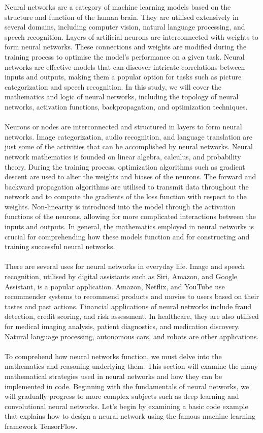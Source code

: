 \documentclass{article}[12pt]
\newcounter{example}[section]
\theoremstyle{definition}
\begin{document}
Neural networks are a category of machine learning models based on the structure and function of the human brain. They are utilised extensively in several domains, including computer vision, natural language processing, and speech recognition. Layers of artificial neurons are interconnected with weights to form neural networks. These connections and weights are modified during the training process to optimise the model's performance on a given task. Neural networks are effective models that can discover intricate correlations between inputs and outputs, making them a popular option for tasks such as picture categorization and speech recognition. In this study, we will cover the mathematics and logic of neural networks, including the topology of neural networks, activation functions, backpropagation, and optimization techniques.
\\
\\
Neurons or nodes are interconnected and structured in layers to form neural networks. Image categorization, audio recognition, and language translation are just some of the activities that can be accomplished by neural networks. Neural network mathematics is founded on linear algebra, calculus, and probability theory. During the training process, optimization algorithms such as gradient descent are used to alter the weights and biases of the neurons. The forward and backward propagation algorithms are utilised to transmit data throughout the network and to compute the gradients of the loss function with respect to the weights. Non-linearity is introduced into the model through the activation functions of the neurons, allowing for more complicated interactions between the inputs and outputs. In general, the mathematics employed in neural networks is crucial for comprehending how these models function and for constructing and training successful neural networks.
\\
\\
There are several uses for neural networks in everyday life. Image and speech recognition, utilised by digital assistants such as Siri, Amazon, and Google Assistant, is a popular application. Amazon, Netflix, and YouTube use recommender systems to recommend products and movies to users based on their tastes and past actions. Financial applications of neural networks include fraud detection, credit scoring, and risk assessment. In healthcare, they are also utilised for medical imaging analysis, patient diagnostics, and medication discovery. Natural language processing, autonomous cars, and robots are other applications.
\\
\\
To comprehend how neural networks function, we must delve into the mathematics and reasoning underlying them. This section will examine the many mathematical strategies used in neural networks and how they can be implemented in code. Beginning with the fundamentals of neural networks, we will gradually progress to more complex subjects such as deep learning and convolutional neural networks. Let's begin by examining a basic code example that explains how to design a neural network using the famous machine learning framework TensorFlow.
\end{document}
